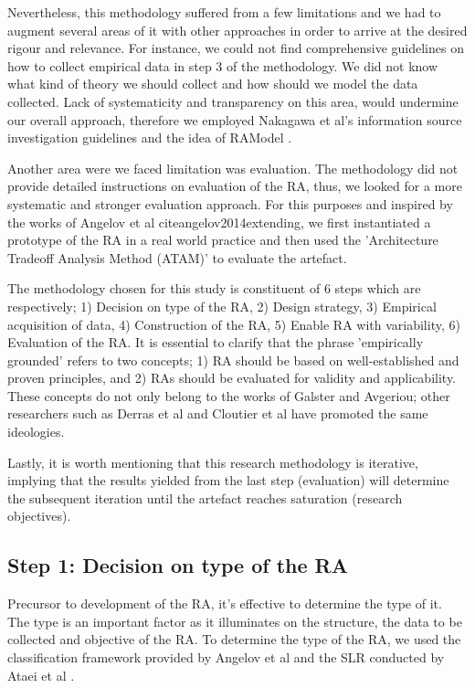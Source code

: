 \documentclass[runningheads]{llncs}
\begin{document}
Nevertheless, this methodology suffered from a few limitations and we had to augment several areas of it with other approaches in order to arrive at the desired rigour and relevance. For instance, we could not find comprehensive guidelines on how to collect empirical data in step 3 of the methodology. We did not know what kind of theory we should collect and how should we model the data collected. Lack of systematicity and transparency on this area, would undermine our overall approach, therefore we employed Nakagawa et al's information source investigation guidelines and the idea of RAModel \cite{nakagawa2012ramodel}. 

Another area were we faced limitation was evaluation. The methodology did not provide detailed instructions on evaluation of the RA, thus, we looked for a more systematic and stronger evaluation approach. For this purposes and inspired by the works of Angelov et al \cite{angelov2008towards} cite{angelov2014extending}, we first instantiated a prototype of the RA in a real world practice and then used the 'Architecture Tradeoff Analysis Method (ATAM)'\cite{KazmanATAM} to evaluate the artefact.

The methodology chosen for this study is constituent of 6 steps which are respectively; 1) Decision on type of the RA, 2) Design strategy, 3) Empirical acquisition of data, 4) Construction of the RA, 5) Enable RA with variability, 6) Evaluation of the RA. It is essential to clarify that the phrase 'empirically grounded' refers to two concepts; 1) RA should be based on well-established and proven principles, and 2) RAs should be evaluated for validity and applicability. These concepts do not only belong to the works of Galster and Avgeriou; other researchers such as Derras et al \cite{Derras} and Cloutier et al \cite{Cloutier} have promoted the same ideologies. 

Lastly, it is worth mentioning that this research methodology is iterative, implying that the results yielded from the last step (evaluation) will determine the subsequent iteration until the artefact reaches saturation (research objectives).

\subsection{Step 1: Decision on type of the RA}
Precursor to development of the RA, it's effective to determine the type of it. The type is an important factor as it illuminates on the structure, the data to be collected and objective of the RA. To determine the type of the RA, we used the classification framework provided by Angelov et al \cite{angelov2009classification} and the SLR conducted by Ataei et al \cite{AtaeiACIS}. 
\end{document}
